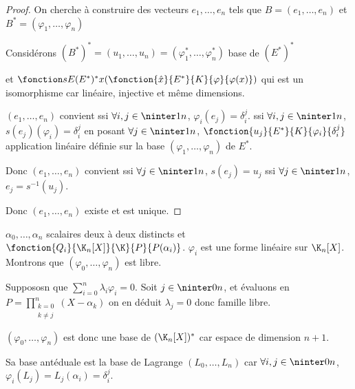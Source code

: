 \begin{proof}
    On cherche à construire des vecteurs $e_1, \dots, e_n$ tels que 
    $B = (e_1, \dots, e_n)$ et $B^* = (\varphi_1, \dots, \varphi_n)$

    Considérons $(B^*)^* = (u_1, \dots, u_n) = (\varphi_1^*, \dots, \varphi_n^*)$ base de $(E^*)^*$

    et $\fonction s E {(E^*)^*} x {\left( \fonction{\hat x}{E^*}{K}{\varphi}{\varphi(x)} \right)}$ qui est un isomorphisme 
    car linéaire, injective et même dimensions. 

    $(e_1, \dots, e_n)$ convient ssi $\forall i, j \in \ninter 1 n$, $\varphi_i(e_j) = \delta_i^j$.
    ssi $\forall i, j \in \ninter 1 n$, $s(e_j)(\varphi_i) = \delta_i^j$ 
    en posant $\forall j \in \ninter 1 n$, $\fonction{u_j}{E^*}{K}{\varphi_i}{\delta_i^j}$ 
    application linéaire définie sur la base $(\varphi_1, \dots, \varphi_n)$ de $E^*$.

    Donc $(e_1, \dots, e_n)$ convient ssi $\forall j \in \ninter 1 n$, $s(e_j) = u_j$
    ssi $\forall j \in \ninter 1 n$, $e_j = s^{-1}(u_j)$.

    Donc $(e_1, \dots, e_n)$ existe et est unique.
\end{proof}

\begin{exemple}
    $\alpha_0, \dots, \alpha_n$ scalaires deux à deux distincts et $\fonction{Q_i}{\K_n[X]}{\K}{P}{P(\alpha_i)}$.
    $\varphi_i$ est une forme linéaire sur $\K_n[X]$. Montrons que $(\varphi_0, \dots, \varphi_n)$ est libre. 

    Suppososn que $\sum_{i=0}^n \lambda_i \varphi_i = 0$. 
    Soit $j \in \ninter 0 n$, et évaluons en $P = \prod_{\substack{k=0 \\ k \neq j}}^n (X - \alpha_k)$ on en 
    déduit $\lambda_j = 0$ donc famille libre.

    $(\varphi_0, \dots, \varphi_n)$ est donc une base de $(\K_n[X])^*$ car espace de dimension $n + 1$.

    Sa base antéduale est la base de Lagrange $(L_0, \dots, L_n)$ car $\forall i, j \in \ninter 0 n$, $\varphi_i(L_j) = L_j(\alpha_i) = \delta_i^j$.
\end{exemple}

